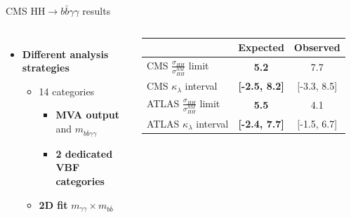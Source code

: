 \begin{frame}{CMS HH$\to b\bar{b}\gamma\gamma$ results}

\begin{columns}

\begin{itemize}
    \item \textbf{\textcolor{structurColor}{Different analysis strategies}}
    \begin{itemize}
        \item 14 categories
        \begin{itemize}
            \item \textbf{MVA output} and \textbf{$m_{b\bar{b}\gamma\gamma}$}
            \item \textbf{2 dedicated VBF categories} 
        \end{itemize}
        \item \textcolor{HHturquoise_d}{\textbf{2D fit}} $m_{\gamma\gamma}\times m_{b\bar{b}}$
    \end{itemize}
\end{itemize}

\begin{table}[]
    \centering
    \begin{tabular}{lcc}
    \hline\hline
    & Expected & Observed \\
    \hline 
    CMS $\frac{\sigma_{HH}}{\sigma_{HH}^{SM}}$ limit & \textbf{5.2} & 7.7 \\
    CMS $\kappa_{\lambda}$ interval & \textbf{[-2.5, 8.2]} & [-3.3, 8.5] \\
    \hline 
    ATLAS $\frac{\sigma_{HH}}{\sigma_{HH}^{SM}}$ limit & \textbf{5.5} & 4.1 \\
    ATLAS $\kappa_{\lambda}$ interval & \textcolor{HHred}{\textbf{[-2.4, 7.7]}} & [-1.5, 6.7] \\ 
    \hline\hline
    \end{tabular}
    
\end{table}



\end{columns}
\end{frame}
